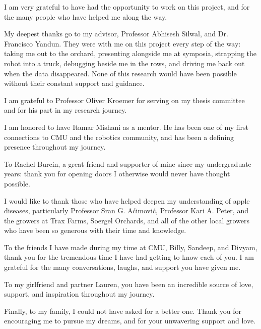 
\setlength{\parskip}{1em}
\setlength{\parindent}{0em}

\noindent
I am very grateful to have had the opportunity to work on this
project, and for the many people who have helped me along the
way.

My deepest thanks go to my advisor, Professor Abhisesh Silwal, 
and Dr. Francisco Yandun.
They were with me on this project every step of the way: taking me
out to the orchard, presenting alongside me at symposia, strapping
the robot into a truck, debugging beside me in the rows, and driving
me back out when the data disappeared. None of this research would
have been possible without their constant support and guidance.

I am grateful to Professor Oliver Kroemer for serving on my 
thesis committee and for his part in my research journey.

I am honored to have Itamar Mishani as a mentor.
He has been one of my first connections to CMU and the robotics
community, and has been a defining presence throughout my journey.

To Rachel Burcin, a great friend and supporter of mine since my
undergraduate years: thank you for opening doors I otherwise would
never have thought possible.

I would like to thank those who have helped deepen my understanding 
of apple diseases, particularly Professor Sr\dj{}an G. A\'{c}imovi\'{c}, 
Professor Kari A. Peter, and the growers at Trax Farms, Soergel Orchards,
and all of the other local growers who have been so generous with their 
time and knowledge.

To the friends I have made during my time at CMU, Billy, Sandeep, 
and Divyam, thank you for the tremendous time I have had getting 
to know each of you. I am grateful for the many conversations, 
laughs, and support you have given me.

To my girlfriend and partner Lauren, you have been 
an incredible source of love, support, and inspiration throughout 
my journey.

Finally, to my family, I could not have asked for a better one. 
Thank you for encouraging me to pursue my dreams, and for your 
unwavering support and love.


